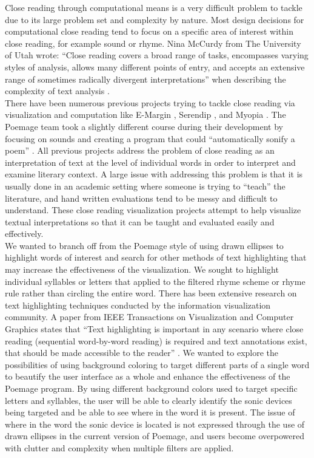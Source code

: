 \documentclass[journal]{vgtc}                %
\begin{document}
Close reading through computational means is a very difficult problem to tackle due to its large problem set and complexity by nature. Most design decisions for computational close reading tend to focus on a specific area of interest within close reading, for example sound or rhyme. Nina McCurdy from The University of Utah wrote: ``Close reading covers a broad range of tasks, encompasses varying styles of analysis, allows many different points of entry, and accepts an extensive range of sometimes radically divergent interpretations'' when describing the complexity of text analysis \cite{poemage}.\\
\indent There have been numerous previous projects trying to tackle close reading via visualization and computation like E-Margin \cite{emargin}, Serendip \cite{serendip}, and Myopia \cite{myopia}. The Poemage team took a slightly different course during their development by focusing on sounds and creating a program that could ``automatically sonify a poem'' \cite{poemage}. All previous projects address the problem of close reading as an interpretation of text at the level of individual words in order to interpret and examine literary context. A large issue with addressing this problem is that it is usually done in an academic setting where someone is trying to ``teach'' the literature, and hand written evaluations tend to be messy and difficult to understand. These close reading visualization projects attempt to help visualize textual interpretations so that it can be taught and evaluated easily and effectively.\\
\indent We wanted to branch off from the Poemage style of using drawn ellipses to highlight words of interest and search for other methods of text highlighting that may increase the effectiveness of the visualization. We sought to highlight individual syllables or letters that applied to the filtered rhyme scheme or rhyme rule rather than circling the entire word. There has been extensive research on text highlighting techniques conducted by the information visualization community. A paper from IEEE Transactions on Visualization and Computer Graphics states that ``Text highlighting is important in any scenario where close reading (sequential word-by-word reading) is required and text annotations exist, that should be made accessible to the reader'' \cite{texthighlighting}. We wanted to explore the possibilities of using background coloring to target different parts of a single word to beautify the user interface as a whole and enhance the effectiveness of the Poemage program. By using different background colors used to target specific letters and syllables, the user will be able to clearly identify the sonic devices being targeted and be able to see where in the word it is present. The issue of where in the word the sonic device is located is not expressed through the use of drawn ellipses in the current version of Poemage, and users become overpowered with clutter and complexity when multiple filters are applied. 
\end{document}
